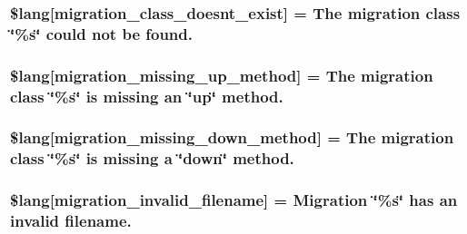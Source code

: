\subsubsection[{\$lang}]{\setlength{\rightskip}{0pt plus 5cm}\$lang\mbox{[}\textquotesingle{}migration\+\_\+class\+\_\+doesnt\+\_\+exist\textquotesingle{}\mbox{]} = \textquotesingle{}The migration class \char`\"{}\%s\char`\"{} could not be found.\textquotesingle{}}\label{migration__lang_8php_a141dceda5b8294f6e4ddf7e5da6fe71d}
\hypertarget{migration__lang_8php_a4bc9c60a4f078d1845d1d72370c363e8}{}
\subsubsection[{\$lang}]{\setlength{\rightskip}{0pt plus 5cm}\$lang\mbox{[}\textquotesingle{}migration\+\_\+missing\+\_\+up\+\_\+method\textquotesingle{}\mbox{]} = \textquotesingle{}The migration class \char`\"{}\%s\char`\"{} is missing an \char`\"{}up\char`\"{} method.\textquotesingle{}}\label{migration__lang_8php_a4bc9c60a4f078d1845d1d72370c363e8}
\hypertarget{migration__lang_8php_a6e835ce0b327b8ea1df42bfc7a59f1cd}{}
\subsubsection[{\$lang}]{\setlength{\rightskip}{0pt plus 5cm}\$lang\mbox{[}\textquotesingle{}migration\+\_\+missing\+\_\+down\+\_\+method\textquotesingle{}\mbox{]} = \textquotesingle{}The migration class \char`\"{}\%s\char`\"{} is missing {\bf a} \char`\"{}down\char`\"{} method.\textquotesingle{}}\label{migration__lang_8php_a6e835ce0b327b8ea1df42bfc7a59f1cd}
\hypertarget{migration__lang_8php_a75ef7572f25674e4dd1e36a0d61080fa}{}
\subsubsection[{\$lang}]{\setlength{\rightskip}{0pt plus 5cm}\$lang\mbox{[}\textquotesingle{}migration\+\_\+invalid\+\_\+filename\textquotesingle{}\mbox{]} = \textquotesingle{}Migration \char`\"{}\%s\char`\"{} has an invalid filename.\textquotesingle{}}\label{migration__lang_8php_a75ef7572f25674e4dd1e36a0d61080fa}
